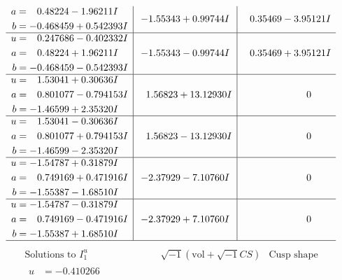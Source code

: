 \documentclass[1p]{elsarticle_modified}
\theoremstyle{definition}
\newcommand{\I}{\sqrt{-1}}
\begin{document}
$$\begin{array}{c|c|c}
\begin{aligned}
a &= \phantom{-}0.48224 - 1.96211 I \\
b &= -0.468459 + 0.542393 I\end{aligned}
 & -1.55343 + 0.99744 I & \phantom{-}0.35469 - 3.95121 I \\ \hline\begin{aligned}
u &= \phantom{-}0.247686 - 0.402332 I \\
a &= \phantom{-}0.48224 + 1.96211 I \\
b &= -0.468459 - 0.542393 I\end{aligned}
 & -1.55343 - 0.99744 I & \phantom{-}0.35469 + 3.95121 I \\ \hline\begin{aligned}
u &= \phantom{-}1.53041 + 0.30636 I \\
a &= \phantom{-}0.801077 - 0.794153 I \\
b &= -1.46599 + 2.35320 I\end{aligned}
 & \phantom{-}1.56823 + 13.12930 I & \phantom{-0.000000 } 0 \\ \hline\begin{aligned}
u &= \phantom{-}1.53041 - 0.30636 I \\
a &= \phantom{-}0.801077 + 0.794153 I \\
b &= -1.46599 - 2.35320 I\end{aligned}
 & \phantom{-}1.56823 - 13.12930 I & \phantom{-0.000000 } 0 \\ \hline\begin{aligned}
u &= -1.54787 + 0.31879 I \\
a &= \phantom{-}0.749169 + 0.471916 I \\
b &= -1.55387 - 1.68510 I\end{aligned}
 & -2.37929 - 7.10760 I & \phantom{-0.000000 } 0 \\ \hline\begin{aligned}
u &= -1.54787 - 0.31879 I \\
a &= \phantom{-}0.749169 - 0.471916 I \\
b &= -1.55387 + 1.68510 I\end{aligned}
 & -2.37929 + 7.10760 I & \phantom{-0.000000 } 0\\
 \hline 
 \end{array}$$\newpage$$\begin{array}{c|c|c}  
\text{Solutions to }I^u_{1}& \I (\text{vol} + \sqrt{-1}CS) & \text{Cusp shape}\\
 \hline 
\begin{aligned}
u &= -0.410266\phantom{ +0.000000I} \\

\end{aligned}
\end{array}$$
\end{document}
